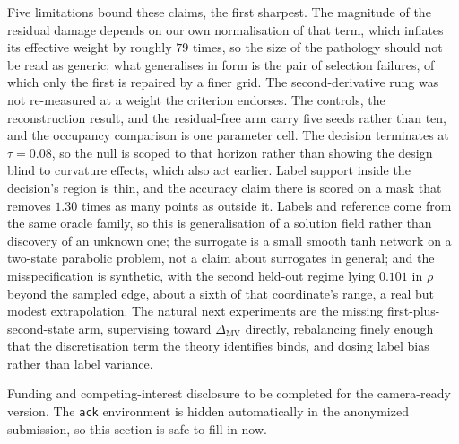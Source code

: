 \documentclass{article}
\begin{document}
Five limitations bound these claims, the first sharpest. The magnitude of the
residual damage depends on our own normalisation of that term, which inflates its
effective weight by roughly $79$ times, so the size of the pathology should not be
read as generic; what generalises in form is the pair of selection failures, of
which only the first is repaired by a finer grid. The second-derivative rung was not re-measured at a weight the criterion endorses.
The controls, the reconstruction result, and the residual-free arm carry five seeds
rather than ten, and the occupancy comparison is one parameter cell. The decision
terminates at $\tau = 0.08$, so the null is scoped to that horizon rather than
showing the design blind to curvature effects, which also act earlier. Label support
inside the decision's region is thin, and the accuracy claim there is scored on a
mask that removes $1.30$ times as many points as outside it. Labels and reference
come from the same oracle family, so this is generalisation of a solution field
rather than discovery of an unknown one; the surrogate is a small smooth tanh
network on a two-state parabolic problem, not a claim about surrogates in general;
and the misspecification is synthetic, with the second held-out regime lying
$0.101$ in $\rho$ beyond the sampled edge, about a sixth of that coordinate's range,
a real but modest extrapolation. The natural next experiments are the missing
first-plus-second-state arm, supervising toward $\Delta_{\mathrm{MV}}$ directly,
rebalancing finely enough that the discretisation term the theory identifies binds,
and dosing label bias rather than label variance.

\begin{ack}
Funding and competing-interest disclosure to be completed for the camera-ready
version. The \texttt{ack} environment is hidden automatically in the anonymized
submission, so this section is safe to fill in now.
\end{ack}
\end{document}
